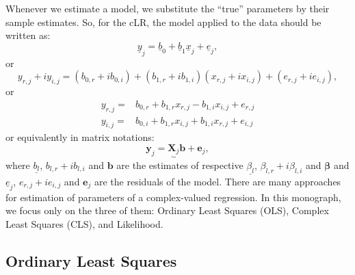 \documentclass[
]{book}
\begin{document}
Whenever we estimate a model, we substitute the ``true'' parameters by their sample estimates. So, for the cLR, the model applied to the data should be written as:
\begin{equation}
    \underline{y}_j = \underline{b}_0 + \underline{b}_1 \underline{x}_j + \underline{e}_j,
    \label{eq:SimpleCLRComplexEstimated}
\end{equation}
or
\begin{equation}
    y_{r,j}+i y_{i,j} = (b_{0,r} + i b_{0,i}) + (b_{1,r} + i b_{1,i}) (x_{r,j}+i x_{i,j}) + (e_{r,j} + i e_{i,j}),
    \label{eq:SimpleCLREstimated}
\end{equation}
or
\begin{equation}
    \begin{aligned}
        y_{r,j} = & b_{0,r} + b_{1,r} x_{r,j} - b_{1,i} x_{i,j} + e_{r,j} \\
        y_{i,j} = & b_{0,i} + b_{1,r} x_{i,j} + b_{1,i} x_{r,j} + e_{i,j}
    \end{aligned}
    \label{eq:SimpleCLRSystemEstimated}
\end{equation}
or equivalently in matrix notations:
\begin{equation}
    \mathbf{y}_j = \underset{\sim}{\mathbf{X}_j} \boldsymbol{b} + \boldsymbol{e}_j ,
    \label{eq:SimpleCLRSystemVector03Estimated}
\end{equation}
where \(\underline{b_{l}}\), \(b_{l,r}+ib_{l,i}\) and \(\boldsymbol{b}\) are the estimates of respective \(\underline{\beta_l}\), \(\beta_{l,r} + i \beta_{l,i}\) and \(\boldsymbol{\beta}\) and \(\underline{e}_j\), \(e_{r,j} + i e_{i,j}\) and \(\boldsymbol{e}_j\) are the residuals of the model. There are many approaches for estimation of parameters of a complex-valued regression. In this monograph, we focus only on the three of them: Ordinary Least Squares (OLS), Complex Least Squares (CLS), and Likelihood.

\hypertarget{SCLREstimationOLS}{%
\subsection{Ordinary Least Squares}\label{SCLREstimationOLS}}
\end{document}
